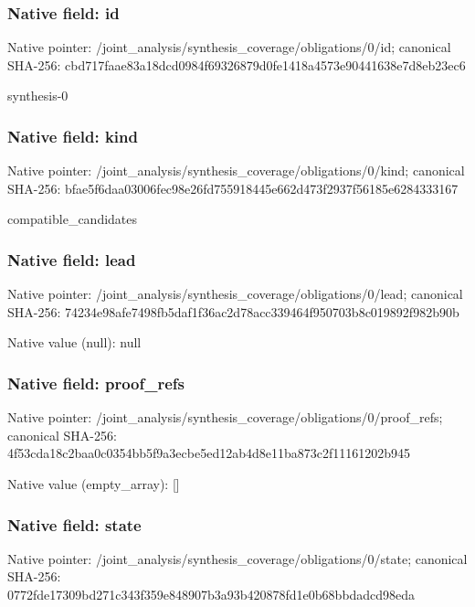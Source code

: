 \documentclass[10pt,a4paper]{article}
\begin{document}
\subsubsection{Native field: id}
Native pointer: /joint\_\allowbreak{}analysis/synthesis\_\allowbreak{}coverage/obligations/0/id; canonical SHA-256: cbd717faae83a18dcd0984f69326879d0fe1418a4573e90441638e7d8eb23ec6

\begingroup\raggedright\sloppy synthesis-0\par\endgroup

\subsubsection{Native field: kind}
Native pointer: /joint\_\allowbreak{}analysis/synthesis\_\allowbreak{}coverage/obligations/0/kind; canonical SHA-256: bfae5f6daa03006fec98e26fd755918445e662d473f2937f56185e6284333167

\begingroup\raggedright\sloppy compatible\_\allowbreak{}candidates\par\endgroup

\subsubsection{Native field: lead}
Native pointer: /joint\_\allowbreak{}analysis/synthesis\_\allowbreak{}coverage/obligations/0/lead; canonical SHA-256: 74234e98afe7498fb5daf1f36ac2d78acc339464f950703b8c019892f982b90b

Native value (null): null

\subsubsection{Native field: proof\_\allowbreak{}refs}
Native pointer: /joint\_\allowbreak{}analysis/synthesis\_\allowbreak{}coverage/obligations/0/proof\_\allowbreak{}refs; canonical SHA-256: 4f53cda18c2baa0c0354bb5f9a3ecbe5ed12ab4d8e11ba873c2f11161202b945

Native value (empty\_\allowbreak{}array): []

\subsubsection{Native field: state}
Native pointer: /joint\_\allowbreak{}analysis/synthesis\_\allowbreak{}coverage/obligations/0/state; canonical SHA-256: 0772fde17309bd271c343f359e848907b3a93b420878fd1e0b68bbdadcd98eda
\end{document}
